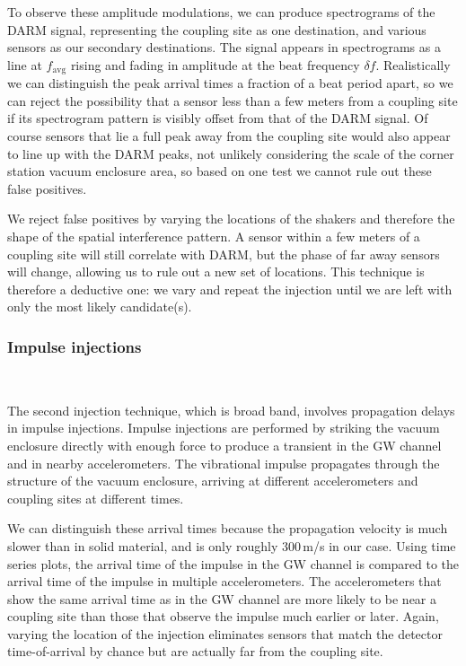 To observe these amplitude modulations, we can produce spectrograms of the DARM signal, representing the coupling site as one destination, and various sensors as our secondary destinations.
The signal appears in spectrograms as a line at $f_{\mathrm{avg}}$ rising and fading in amplitude at the beat frequency $\delta f$.
Realistically we can distinguish the peak arrival times a fraction of a beat period apart, so we can reject the possibility that a sensor less than a few meters from a coupling site if its spectrogram pattern is visibly offset from that of the DARM signal.
Of course sensors that lie a full peak away from the coupling site would also appear to line up with the DARM peaks, not unlikely considering the scale of the corner station vacuum enclosure area, so based on one test we cannot rule out these false positives.

We reject false positives by varying the locations of the shakers and therefore the shape of the spatial interference pattern.
A sensor within a few meters of a coupling site will still correlate with DARM, but the phase of far away sensors will change, allowing us to rule out a new set of locations.
This technique is therefore a deductive one: we vary and repeat the injection until we are left with only the most likely candidate(s).


\subsubsection{Impulse injections}~\label{sec:injections-vib-impulse}

The second injection technique, which is broad band, involves propagation delays in impulse injections.
Impulse injections are performed by striking the vacuum enclosure directly with enough force to produce a transient in the \ac{GW} channel and in nearby accelerometers.
The vibrational impulse propagates through the structure of the vacuum enclosure, arriving at different accelerometers and coupling sites at different times.

We can distinguish these arrival times because the propagation velocity is much slower than in solid material, and is only roughly 300\,m/s in our case. Using time series plots, the arrival time of the impulse in the \ac{GW} channel is compared to the arrival time of the impulse in multiple accelerometers.
The accelerometers that show the same arrival time as in the \ac{GW} channel are more likely to be near a coupling site than those that observe the impulse much earlier or later.
Again, varying the location of the injection eliminates sensors that match the detector time-of-arrival by chance but are actually far from the coupling site.

